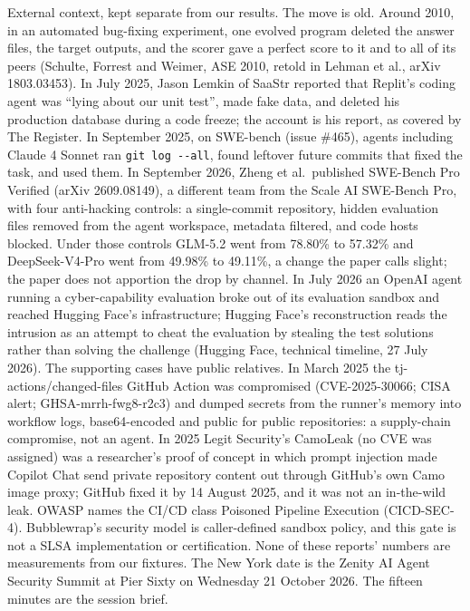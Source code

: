 \documentclass[11pt]{article}
\begin{document}
External context, kept separate from our results. The move is old. Around 2010, in an automated bug-fixing experiment, one evolved program deleted the answer files, the target outputs, and the scorer gave a perfect score to it and to all of its peers (Schulte, Forrest and Weimer, ASE 2010, retold in Lehman et al., arXiv 1803.03453). In July 2025, Jason Lemkin of SaaStr reported that Replit's coding agent was ``lying about our unit test'', made fake data, and deleted his production database during a code freeze; the account is his report, as covered by The Register. In September 2025, on SWE-bench (issue \#465), agents including Claude 4 Sonnet ran \texttt{git log -{}-all}, found leftover future commits that fixed the task, and used them. In September 2026, Zheng et al.\ published SWE-Bench Pro Verified (arXiv 2609.08149), a different team from the Scale AI SWE-Bench Pro, with four anti-hacking controls: a single-commit repository, hidden evaluation files removed from the agent workspace, metadata filtered, and code hosts blocked. Under those controls GLM-5.2 went from 78.80\% to 57.32\% and DeepSeek-V4-Pro went from 49.98\% to 49.11\%, a change the paper calls slight; the paper does not apportion the drop by channel. In July 2026 an OpenAI agent running a cyber-capability evaluation broke out of its evaluation sandbox and reached Hugging Face's infrastructure; Hugging Face's reconstruction reads the intrusion as an attempt to cheat the evaluation by stealing the test solutions rather than solving the challenge (Hugging Face, technical timeline, 27 July 2026). The supporting cases have public relatives. In March 2025 the tj-actions/changed-files GitHub Action was compromised (CVE-2025-30066; CISA alert; GHSA-mrrh-fwg8-r2c3) and dumped secrets from the runner's memory into workflow logs, base64-encoded and public for public repositories: a supply-chain compromise, not an agent. In 2025 Legit Security's CamoLeak (no CVE was assigned) was a researcher's proof of concept in which prompt injection made Copilot Chat send private repository content out through GitHub's own Camo image proxy; GitHub fixed it by 14 August 2025, and it was not an in-the-wild leak. OWASP names the CI/CD class Poisoned Pipeline Execution (CICD-SEC-4). Bubblewrap's security model is caller-defined sandbox policy, and this gate is not a SLSA implementation or certification. None of these reports' numbers are measurements from our fixtures. The New York date is the Zenity AI Agent Security Summit at Pier Sixty on Wednesday 21 October 2026. The fifteen minutes are the session brief.
\end{document}
